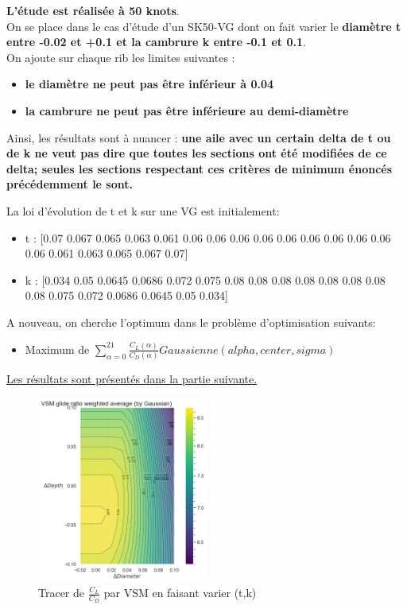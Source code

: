 \textbf{L'étude est réalisée à 50 knots}.\\
On se place dans le cas d'étude d'un SK50-VG dont on fait varier le \textbf{diamètre t entre -0.02 et +0.1 et la cambrure k entre -0.1 et 0.1}. \\
    
    On ajoute sur chaque rib les limites suivantes :
    \begin{itemize}
        \item \textbf{le diamètre ne peut pas être inférieur à 0.04}
        \item \textbf{la cambrure ne peut pas être inférieure au demi-diamètre}
    \end{itemize}

    Ainsi, les résultats sont à nuancer : \textbf{une aile avec un certain delta de t ou de k ne veut pas dire que toutes les sections ont été modifiées de ce delta; seules les sections respectant ces critères de minimum énoncés précédemment le sont.}

La loi d'évolution de t et k sur une VG est initialement:  
\begin{itemize}
    \item t : [0.07 0.067 0.065 0.063 0.061 0.06 0.06  0.06 0.06 0.06  0.06  0.06 0.06 0.06  0.06 0.061 0.063 0.065 0.067 0.07]
    \item k : [0.034 0.05 0.0645 0.0686 0.072 0.075 0.08 0.08 0.08 0.08      0.08 0.08 0.08 0.08 0.075 0.072 0.0686 0.0645 0.05 0.034]
\end{itemize}

    A nouveau, on cherche l'optimum dans le problème d'optimisation suivants:
    \begin{itemize}
        \item Maximum de $\sum_{\alpha = 0}^{21}\frac{C_L(\alpha)}{C_D(\alpha)} Gaussienne(alpha, center, sigma) $
    \end{itemize}
    \underline{Les résultats sont présentés dans la partie suivante.}

\begin{figure}[H]
    \centering
    \includegraphics[width=0.5\textwidth]{Pics/vsm.png}  
    \caption{Tracer de $\frac{C_L}{C_D}$ par VSM en faisant varier (t,k)}
    \label{fig:vsm}
\end{figure}